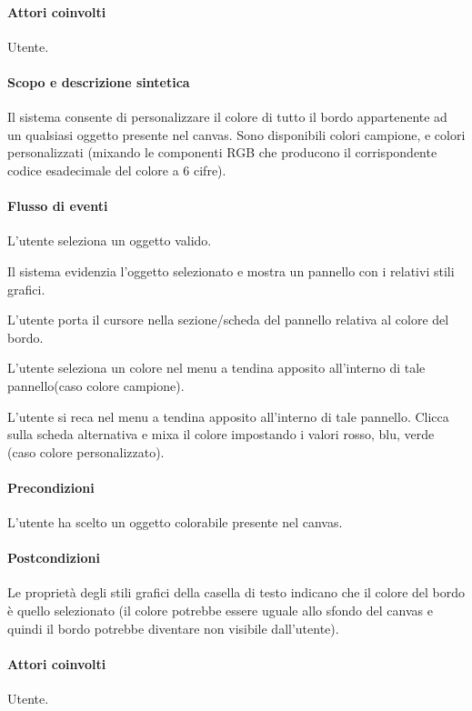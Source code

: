 \paragraph{Attori coinvolti} Utente.
\paragraph{Scopo e descrizione sintetica} Il sistema consente di personalizzare il colore di tutto il bordo appartenente ad un qualsiasi oggetto presente nel canvas. Sono disponibili colori campione, e colori personalizzati (mixando le componenti RGB che producono il corrispondente codice esadecimale del colore a 6 cifre).
\paragraph{Flusso di eventi}
\begin{elenconumerato}[\textbf{}]{\subsubsecindent}
\item L'utente seleziona un oggetto valido.
\item Il sistema evidenzia l'oggetto selezionato e mostra un pannello con i relativi stili grafici.
\item L'utente  porta  il cursore nella sezione/scheda del pannello relativa al colore del bordo.
\item L'utente seleziona un colore  nel menu a tendina apposito all'interno di tale pannello(caso colore campione).
\item L'utente si reca nel menu a tendina apposito all'interno di tale pannello. Clicca sulla scheda alternativa e mixa il colore impostando i valori rosso, blu, verde (caso colore personalizzato).
\end{elenconumerato}
\paragraph{Precondizioni} L'utente ha scelto un oggetto colorabile presente nel canvas.
\paragraph{Postcondizioni} Le propriet\` a degli stili grafici della casella di testo indicano che il colore del bordo \`e quello selezionato (il colore potrebbe essere uguale allo sfondo del canvas e quindi il bordo potrebbe diventare non visibile dall'utente).


\paragraph{Attori coinvolti} Utente.
